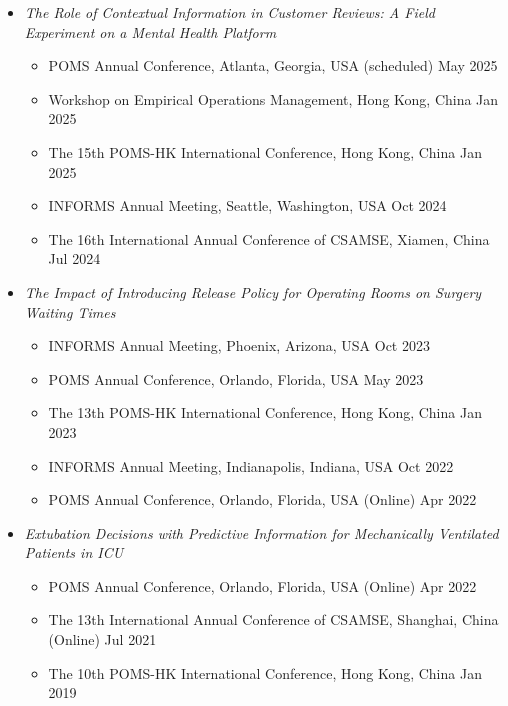\documentclass[12pt, a4paper]{article}
\begin{document}
{\begin{itemize}[leftmargin=14pt]

	\item[] {\it The Role of Contextual Information in Customer Reviews: A Field Experiment on a Mental Health Platform}
	\begin{itemize}[label=$\bullet$]
		\item POMS Annual Conference, Atlanta, Georgia, USA (scheduled) \hfill May 2025
		\item Workshop on Empirical Operations Management, Hong Kong, China \hfill Jan 2025
		\item The 15th POMS-HK International Conference, Hong Kong, China \hfill Jan 2025
		\item INFORMS Annual Meeting, Seattle, Washington, USA \hfill Oct 2024
		\item The 16th International Annual Conference of CSAMSE, Xiamen, China \hfill Jul 2024
	\end{itemize}

	\item[] {\it The Impact of Introducing Release Policy for Operating Rooms on Surgery Waiting Times}
	\begin{itemize}[label=$\bullet$]
		\item INFORMS Annual Meeting, Phoenix, Arizona, USA \hfill Oct 2023
		\item POMS Annual Conference, Orlando, Florida, USA \hfill May 2023
		\item The 13th POMS-HK International Conference, Hong Kong, China \hfill Jan 2023
		\item INFORMS Annual Meeting, Indianapolis, Indiana, USA \hfill Oct 2022
		\item POMS Annual Conference, Orlando, Florida, USA (Online) \hfill Apr 2022
	\end{itemize}

	\item[] {\it Extubation Decisions with Predictive Information for Mechanically Ventilated Patients in ICU}
	\begin{itemize}[label=$\bullet$]
		\item POMS Annual Conference, Orlando, Florida, USA (Online) \hfill Apr 2022
		\item The 13th International Annual Conference of CSAMSE, Shanghai, China (Online) \hfill Jul 2021
		\item The 10th POMS-HK International Conference, Hong Kong, China \hfill Jan 2019
	\end{itemize}


\end{itemize}}
\end{document}
